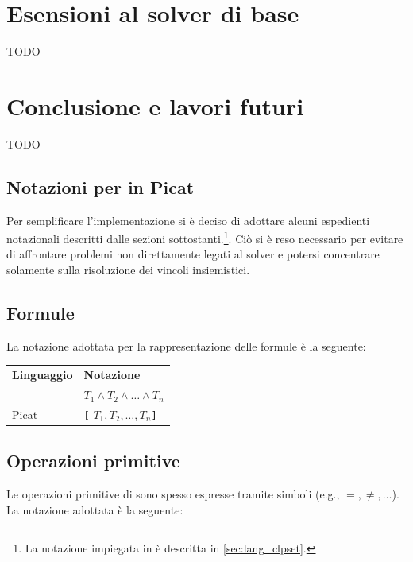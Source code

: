 \documentclass[12pt,a4paper,openright]{book} %
\begin{document}
\chapter{Esensioni al solver di base}
TODO

\chapter{Conclusione e lavori futuri}
TODO


\begin{appendices}

\chapter{Notazioni per \clpset{} in Picat}

Per semplificare l'implementazione si è deciso di adottare alcuni espedienti notazionali descritti dalle sezioni sottostanti.\footnote{La notazione impiegata in \clpset{} è descritta in \ref{sec:lang_clpset}.}. Ciò si è reso necessario per evitare di affrontare problemi non direttamente legati al solver e potersi concentrare solamente sulla risoluzione dei vincoli insiemistici.

\section{Formule}

La notazione adottata per la rappresentazione delle formule è la seguente:

\begin{table}[H]
\center
\begin{tabular}{ll}
\textbf{Linguaggio} & \textbf{Notazione} \\
\clpset{} & $T_1 \land T_2 \land \ldots \land T_n$ \\
Picat & \verb|[| $T_1, T_2, \ldots, T_n$\verb|]| \\
\end{tabular}
\end{table}

\section{Operazioni primitive}

Le operazioni primitive di \clpset{} sono spesso espresse tramite simboli (e.g., $=, \neq, \ldots$). La notazione adottata è la seguente:


\end{appendices}
\end{document}
